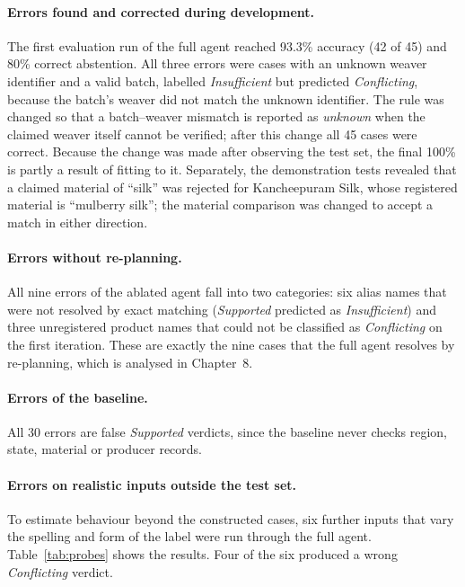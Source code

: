 \paragraph{Errors found and corrected during development.} The first evaluation run of the full agent
reached 93.3\% accuracy (42 of 45) and 80\% correct abstention. All three errors were cases with an
unknown weaver identifier and a valid batch, labelled \emph{Insufficient} but predicted
\emph{Conflicting}, because the batch's weaver did not match the unknown identifier. The rule was
changed so that a batch--weaver mismatch is reported as \emph{unknown} when the claimed weaver itself
cannot be verified; after this change all 45 cases were correct. Because the change was made after
observing the test set, the final 100\% is partly a result of fitting to it. Separately, the
demonstration tests revealed that a claimed material of ``silk'' was rejected for Kancheepuram Silk,
whose registered material is ``mulberry silk''; the material comparison was changed to accept a match in
either direction.

\paragraph{Errors without re-planning.} All nine errors of the ablated agent fall into two categories:
six alias names that were not resolved by exact matching (\emph{Supported} predicted as
\emph{Insufficient}) and three unregistered product names that could not be classified as
\emph{Conflicting} on the first iteration. These are exactly the nine cases that the full agent resolves
by re-planning, which is analysed in Chapter~8.

\paragraph{Errors of the baseline.} All 30 errors are false \emph{Supported} verdicts, since the baseline
never checks region, state, material or producer records.

\paragraph{Errors on realistic inputs outside the test set.} To estimate behaviour beyond the constructed
cases, six further inputs that vary the spelling and form of the label were run through the full agent.
Table~\ref{tab:probes} shows the results. Four of the six produced a wrong \emph{Conflicting} verdict.

